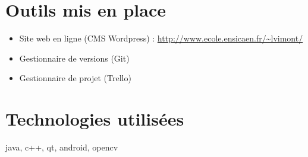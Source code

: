 \section{Outils mis en place}

\begin{itemize}
	\item Site web en ligne (CMS Wordpress) : \url{http://www.ecole.ensicaen.fr/~lvimont/} 
	\item Gestionnaire de versions (Git) 
	\item Gestionnaire de projet (Trello)
\end{itemize}

\section{Technologies utilisées}

java, c++, qt, android, opencv
